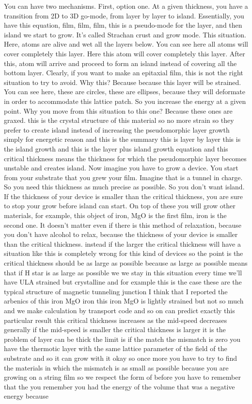 You can have two mechanisms. First, option one. At a given thickness, you have a transition from 2D to 3D go-mode, from layer by layer to island. Essentially, you have this equation, film, film, film, this is a pseudo-mode for the layer, and then island we start to grow. It's called Strachan crust and grow mode. This situation. Here, atoms are alive and wet all the layers below. You can see here all atoms will cover completely this layer. Here this atom will cover completely this layer. After this, atom will arrive and proceed to form an island instead of covering all the bottom layer. Clearly, if you want to make an epitaxial film, this is not the right situation to try to avoid. Why this? Because because this layer will be strained. You can see here, these are circles, these are ellipses, because they will deformate in order to accommodate this lattice patch. So you increase the energy at a given point. Why you move from this situation to this one? Because these ones are graxed. this is the crystal structure of this material so no more strain so they prefer to create island instead of increasing the pseudomorphic layer growth simply for energetic reason and this is the summary this is layer by layer this is the island growth and this is the layer plus island growth equation and this critical thickness means the thickness for which the pseudomorphic layer becomes unstable and creates island. Now imagine you have to grow a device. You start from your substrate that you grew your film. Imagine that is a tunnel in charge. So you need this thickness as much precise as possible. So you don't want island. If the thickness of your device is smaller than the critical thickness, you are sure to stop your grow before island can start. On top of these you will grow other materials, for example, this object of iron, MgO is the first film, iron is the second one. It doesn't matter even if there is this method of relaxation, because you don't have alcohol to relax, because the thickness of your device is smaller than the critical thickness. instead if the larger the critical thickness will have a situation like this is completely wrong for this kind of devices so the point is the critical thickness should be as large as possible because as large as possible means that if H star is as large as possible we we stay in this situation every time we'll have ULA strained but crystalline and for example this is the case these are the typical structure of magnetic tunneling junction I think that I reported the arbenics of this iron MgO iron this iron MgO is lightly strained but not so much and we make calculation by transport code and so on can predict exactly this particular result this critical thickness increases as the mid-speed decreases generally if the mid-speed is smaller the critical thickness is larger it is the problem of layer can be thick the limit is if the match the mismatch is zero you have the thermotic layer with the same lattice parameter of the field of the substrate and so it can grow with it okay so once more you have to try to find the materials in which the mismatch is as small as possible because you are growing on a string film so we respect the form of before you have to remember that the you remember you had the energy of the volume that was a negative energy because 